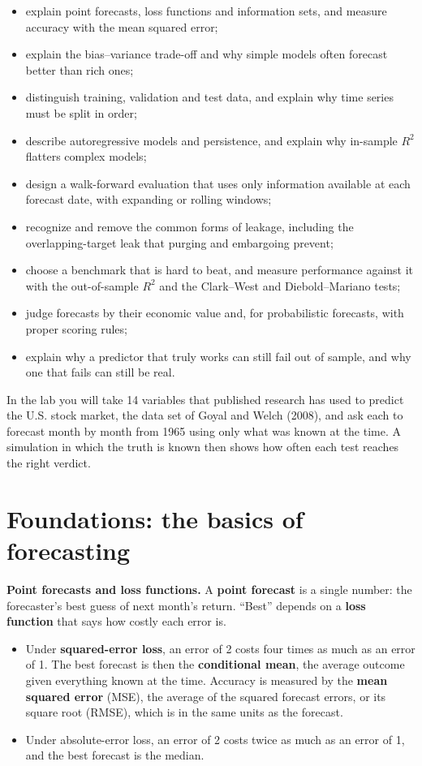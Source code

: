 \begin{itemize}
  \item explain point forecasts, loss functions and information sets, and measure accuracy with the mean squared error;
  \item explain the bias--variance trade-off and why simple models often forecast better than rich ones;
  \item distinguish training, validation and test data, and explain why time series must be split in order;
  \item describe autoregressive models and persistence, and explain why in-sample $R^2$ flatters complex models;
  \item design a walk-forward evaluation that uses only information available at each forecast date, with expanding or rolling windows;
  \item recognize and remove the common forms of leakage, including the overlapping-target leak that purging and embargoing prevent;
  \item choose a benchmark that is hard to beat, and measure performance against it with the out-of-sample $R^2$ and the Clark--West and Diebold--Mariano tests;
  \item judge forecasts by their economic value and, for probabilistic forecasts, with proper scoring rules;
  \item explain why a predictor that truly works can still fail out of sample, and why one that fails can still be real.
\end{itemize}

In the lab you will take 14 variables that published research has used to predict the U.S. stock market, the data set of Goyal and Welch (2008), and ask each to forecast month by month from 1965 using only what was known at the time. A simulation in which the truth is known then shows how often each test reaches the right verdict.

\section{Foundations: the basics of forecasting}
\label{sec:05-foundations}

\textbf{Point forecasts and loss functions.} A \textbf{point forecast} is a single number: the forecaster's best guess of next month's return. ``Best'' depends on a \textbf{loss function} that says how costly each error is.

\begin{itemize}
  \item Under \textbf{squared-error loss}, an error of 2 costs four times as much as an error of 1. The best forecast is then the \textbf{conditional mean}, the average outcome given everything known at the time. Accuracy is measured by the \textbf{mean squared error} (MSE), the average of the squared forecast errors, or its square root (RMSE), which is in the same units as the forecast.
  \item Under absolute-error loss, an error of 2 costs twice as much as an error of 1, and the best forecast is the median.
\end{itemize}

